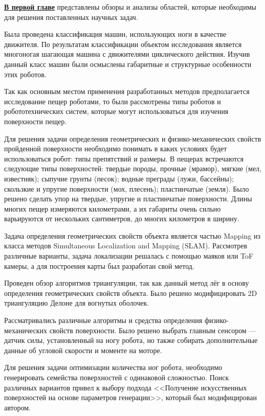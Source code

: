 
\textbf{\underline{В первой главе}} представлены обзоры и анализы областей, которые необходимы для решения поставленных научных задач.

Была проведена классификация машин, использующих ноги в качестве движителя. По результатам классификации объектом исследования является многоногая шагающая машина с движителями циклического действия. Изучив данный класс машин были осмыслены габаритные и структурные особенности этих роботов.

Так как основным местом применения разработанных методов предполагается исследование пещер роботами, то были рассмотрены типы роботов и робототехнических систем, которые могут использоваться для изучения поверхности пещер.

Для решения задачи определения геометрических и физико-механических свойств пройденной поверхности необходимо понимать в каких условиях будет использоваться робот: типы препятствий и размеры. В пещерах встречаются следующие типы поверхностей: твердые породы, прочные (мрамор), мягкие (мел, известняк); сыпучие грунты (песок); водные преграды (лужи, бассейны); скользкие и упругие поверхности (мох, плесень); пластинчатые (земля). Было решено сделать упор на твердые, упругие и пластинчатые поверхности. Длины многих пещер измеряются километрами, а их габариты очень сильно варьируются от нескольких сантиметров, до многих километров в ширину.

Задача определения геометрических свойств объекта является частью Mapping из  класса методов Simultaneous Localization and Mapping (SLAM). Рассмотрев различные варианты, задача локализации решалась с помощью маяков или ToF камеры, а для построения карты был разработан свой метод.

Проведен обзор алгоритмов триангуляции, так как данный метод лёг в основу определения геометрических свойств объекта. Было решено модифицировать 2D триангуляцию Делоне для вогнутых оболочек.

Рассматривались различные алгоритмы и средства определения физико-механических свойств поверхности. Было решено выбрать главным сенсором --- датчик силы, установленный на ногу робота, но также собирать дополнительные данные об угловой скорости и моменте на моторе.

Для решения задачи оптимизации количества ног робота, необходимо генерировать семейства поверхностей с одинаковой сложностью. Поиск различных вариантов привел к выбору подхода <<Получение искусственных поверхностей на основе параметров генерации>>, который был модифицирован автором.

